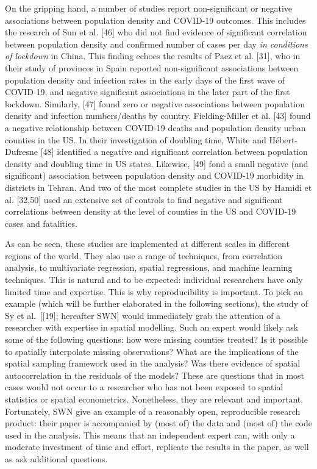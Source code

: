 \documentclass[10pt,letterpaper]{article}
\begin{document}
On the gripping hand, a number of studies report non-significant or
negative associations between population density and COVID-19 outcomes.
This includes the research of Sun et al. {[}46{]} who did not find
evidence of significant correlation between population density and
confirmed number of cases per day \emph{in conditions of lockdown} in
China. This finding echoes the results of Paez et al. {[}31{]}, who in
their study of provinces in Spain reported non-significant associations
between population density and infection rates in the early days of the
first wave of COVID-19, and negative significant associations in the
later part of the first lockdown. Similarly, {[}47{]} found zero or
negative associations between population density and infection
numbers/deaths by country. Fielding-Miller et al. {[}43{]} found a
negative relationship between COVID-19 deaths and population density
urban counties in the US. In their investigation of doubling time, White
and Hébert-Dufresne {[}48{]} identified a negative and significant
correlation between population density and doubling time in US states.
Likewise, {[}49{]} fond a small negative (and significant) association
between population density and COVID-19 morbidity in districts in
Tehran. And two of the most complete studies in the US by Hamidi et al.
{[}32,50{]} used an extensive set of controls to find negative and
significant correlations between density at the level of counties in the
US and COVID-19 cases and fatalities.

As can be seen, these studies are implemented at different scales in
different regions of the world. They also use a range of techniques,
from correlation analysis, to multivariate regression, spatial
regressions, and machine learning techniques. This is natural and to be
expected: individual researchers have only limited time and expertise.
This is why reproducibility is important. To pick an example (which will
be further elaborated in the following sections), the study of Sy et
al.~{[}{[}19{]}; hereafter SWN{]} would immediately grab the attention
of a researcher with expertise in spatial modelling. Such an expert
would likely ask some of the following questions: how were missing
counties treated? Is it possible to spatially interpolate missing
observations? What are the implications of the spatial sampling
framework used in the analysis? Was there evidence of spatial
autocorrelation in the residuals of the models? These are questions that
in most cases would not occur to a researcher who has not been exposed
to spatial statistics or spatial econometrics. Nonetheless, they are
relevant and important. Fortunately, SWN give an example of a reasonably
open, reproducible research product: their paper is accompanied by (most
of) the data and (most of) the code used in the analysis. This means
that an independent expert can, with only a moderate investment of time
and effort, replicate the results in the paper, as well as ask
additional questions.
\end{document}
